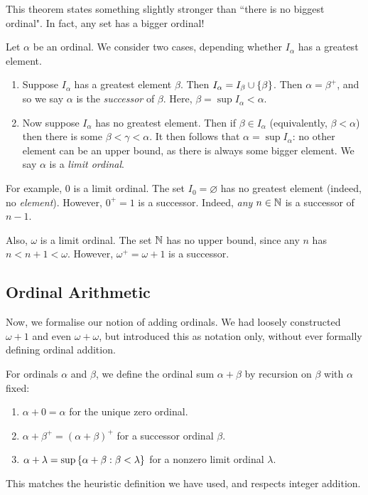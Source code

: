 \documentclass{article}
\begin{document}
\begin{note}
	This theorem states something slightly stronger than ``there is no biggest ordinal". In fact, any set has a bigger ordinal!
\end{note}

\begin{definition}
    Let $\alpha$ be an ordinal. We consider two cases, depending whether $I_\alpha$ has a greatest element.
	\begin{enumerate}
	    \item Suppose $I_\alpha$ has a greatest element $\beta$. Then $I_\alpha = I_\beta \cup \left\lbrace \beta \right\rbrace$. Then $\alpha = \beta^+$, and so we say $\alpha$ is the \textit{successor} of $\beta$. Here, $\beta = \sup I_\alpha < \alpha$.
	    \item Now suppose $I_\alpha$ has no greatest element. Then if $\beta \in I_\alpha$ (equivalently, $\beta < \alpha$) then there is some $\beta < \gamma < \alpha$. It then follows that $\alpha = \sup I_\alpha$: no other element can be an upper bound, as there is always some bigger element. We say $\alpha$ is a \textit{limit ordinal}.
	\end{enumerate}
	For example, 0 is a limit ordinal. The set $I_0 = \varnothing$ has no greatest element (indeed, no \textit{element}). However, $0^+ = 1$ is a successor. Indeed, \textit{any} $n \in \mathbb{N}$ is a successor of $n-1$.
	
	Also, $\omega$ is a limit ordinal. The set $\mathbb{N}$ has no upper bound, since any $n$ has $n < n+1 < \omega$. However, $\omega^+ = \omega + 1$ is a successor.
\end{definition}


\subsection{Ordinal Arithmetic}
\label{section-ordinals-arithmetic}

Now, we formalise our notion of adding ordinals. We had loosely constructed $\omega + 1$ and even $\omega + \omega$, but introduced this as notation only, without ever formally defining ordinal addition.

\begin{definition}
	\label{ordinal-addition-inductive}
    For ordinals $\alpha$ and $\beta$, we define the ordinal sum $\alpha + \beta$ by recursion on $\beta$ with $\alpha$ fixed:
    \begin{enumerate}
    	\item $\alpha + 0 = \alpha$ for the unique zero ordinal.
    	\item $\alpha + \beta^+ = (\alpha + \beta)^+$ for a successor ordinal $\beta$.
    	\item $\alpha + \lambda = \sup\left\lbrace \alpha + \beta : \beta < \lambda \right\rbrace$ for a nonzero limit ordinal $\lambda$.
	\end{enumerate}
	This matches the heuristic definition we have used, and respects integer addition.
\end{definition}
\end{document}
